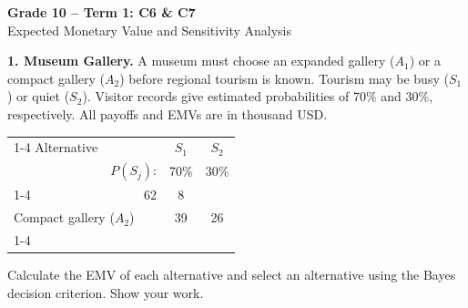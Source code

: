 \makeatletter
{}
\makeatother


\pagestyle{plain}
\setlength{\parskip}{5pt}
\linespread{1.1}


\begin{center}
{\large\textbf{Grade 10 -- Term 1: C6 \& C7}}\\[3pt]
{\large Expected Monetary Value and Sensitivity Analysis}
\end{center}

\noindent\begin{minipage}[t][0.44\textheight][t]{\textwidth}
\textbf{1. Museum Gallery.} A museum must choose an expanded gallery ($A_1$) or a compact gallery ($A_2$)
before regional tourism is known. Tourism may be busy ($S_1$) or quiet ($S_2$).
Visitor records give estimated probabilities of 70\% and 30\%, respectively.
All payoffs and EMVs are in thousand USD.

\begin{center}
\renewcommand{\arraystretch}{1.3}\small
\begin{tabular}{lr@{\qquad}cc}
\cmidrule{1-4}
Alternative && $S_1$ & $S_2$ \\
& $P(S_j)$: & 70\% & 30\% \\
\cmidrule{1-4}
\multicolumn{2}{l}{Expanded gallery ($A_1$)} & 62 & 8 \\
\multicolumn{2}{l}{Compact gallery ($A_2$)} & 39 & 26 \\
\cmidrule{1-4}
\end{tabular}
\end{center}

Calculate the EMV of each alternative and select an alternative using the Bayes decision criterion. Show your work.
\par\vfill
\end{minipage}\par

